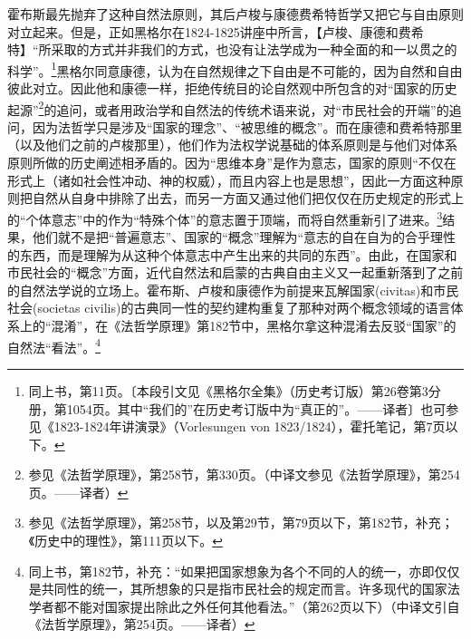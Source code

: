霍布斯最先抛弃了这种自然法原则，其后卢梭与康德费希特哲学又把它与自由原则对立起来。但是，正如黑格尔在1824-1825讲座中所言，【卢梭、康德和费希特】“所采取的方式并非我们的方式，也没有让法学成为一种全面的和一以贯之的科学”。\footnote{同上书，第11页。〔本段引文见《黑格尔全集》（历史考订版）第26卷第3分册，第1054页。其中“我们的”在历史考订版中为“真正的”。——译者〕也可参见《1823-1824年讲演录》（Vorlesungen von 1823/1824），霍托笔记，第7页以下。}黑格尔同意康德，认为在自然规律之下自由是不可能的，因为自然和自由彼此对立。因此他和康德一样，拒绝传统目的论自然观中所包含的对“国家的历史起源”\footnote{参见《法哲学原理》，第258节，第330页。（中译文参见《法哲学原理》，第254页。——译者）}的追问，或者用政治学和自然法的传统术语来说，对“市民社会的开端”的追问，因为法哲学只是涉及“国家的理念”、“被思维的概念”。而在康德和费希特那里（以及他们之前的卢梭那里），他们作为法权学说基础的体系原则是与他们对体系原则所做的历史阐述相矛盾的。因为“思维本身”是作为意志，国家的原则“不仅在形式上（诸如社会性冲动、神的权威），而且内容上也是思想”，因此一方面这种原则把自然从自身中排除了出去，而另一方面又通过他们把仅仅在历史规定的形式上的“个体意志”中的作为“特殊个体”的意志置于顶端，而将自然重新引了进来。\footnote{参见《法哲学原理》，第258节，以及第29节，第79页以下，第182节，补充；《历史中的理性》，第111页以下。}结果，他们就不是把“普遍意志”、国家的“概念”理解为“意志的自在自为的合乎理性的东西，而是理解为从这种个体意志中产生出来的共同的东西”。由此，在国家和市民社会的“概念”方面，近代自然法和启蒙的古典自由主义又一起重新落到了之前的自然法学说的立场上。霍布斯、卢梭和康德作为前提来瓦解国家(civitas)和市民社会(societas civilis)的古典同一性的契约建构重复了那种对两个概念领域的语言体系上的“混淆”，在《法哲学原理》第182节中，黑格尔拿这种混淆去反驳“国家”的自然法“看法”。\footnote{同上书，第182节，补充：“如果把国家想象为各个不同的人的统一，亦即仅仅是共同性的统一，其所想象的只是指市民社会的规定而言。许多现代的国家法学者都不能对国家提出除此之外任何其他看法。”（第262页以下）（中译文引自《法哲学原理》，第254页。——译者）}

